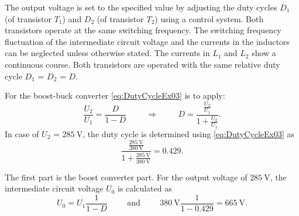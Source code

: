 The output voltage is set to the specified value by adjusting the duty cycles $D_\mathrm{1}$ (of transistor $T_\mathrm{1}$) 
and $D_\mathrm{2}$ (of transistor $T_\mathrm{2}$) using a control system. Both transistors operate at the same switching frequency. 
The switching frequency fluctuation of the intermediate circuit voltage and the currents in the inductors can be neglected unless otherwise stated. 
The currents in $L_\mathrm{1}$ and $L_\mathrm{2}$ show a continuous course. Both transistors are operated with the 
same relative duty cycle $D_\mathrm{1}$ = $D_\mathrm{2}$ = $D$.


\begin{solutionblock}
    For the boost-buck converter \eqref{eq:DutyCycleEx03} is to apply:
    \begin{equation}
        \frac{U_\mathrm{2}}{U_\mathrm{1}} = \frac{D} {1-D}
        \hspace{1cm} \Rightarrow \hspace{1cm}
        D = \frac{\frac{U_\mathrm{2}}{U_\mathrm{1}}} {1+{\frac{U_\mathrm{2}}{U_\mathrm{1}}}}.
        \label{eq:DutyCycleEx03}
    \end{equation}
    In case of $U_\mathrm{2}$ = $\SI{285}{\volt}$, the duty cycle is determined using \eqref{eq:DutyCycleEx03} as
    \begin{equation}
       \frac{\frac{\SI{285}{\volt}}{\SI{380}{\volt}}} {1+{\frac{\SI{285}{\volt}}{\SI{380}{\volt}}}} = 0.429.
    \end{equation}
\end{solutionblock}



\begin{solutionblock}
    The first part is the boost converter part. For the output voltage 
    of $\SI{285}{\volt}$, the intermediate circuit voltage $U_\mathrm{0}$ is calculated as
    \begin{equation}
        U_\mathrm{0}=U_\mathrm{1} \frac{1}{1-D} 
        \hspace{1cm} \mathrm{and} \hspace{1cm}  
        \SI{380}{\volt} \frac{1}{1-0.429} = \SI{665}{\volt}.
        \label{eq:DCLinkEx03}        
    \end{equation}
\end{solutionblock}


